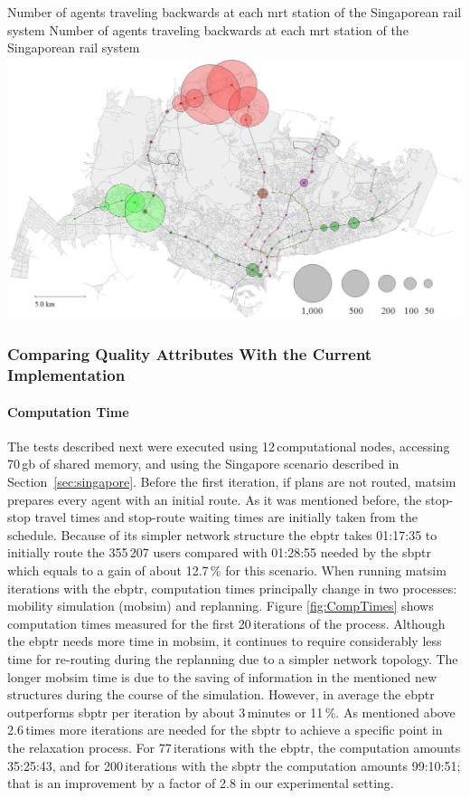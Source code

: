 \createfigure
{Number of agents traveling backwards at each \protect\gls{mrt} station of the Singaporean rail system}
{Number of agents traveling backwards at each \protect\gls{mrt} station of the Singaporean rail system}
{\label{fig:Backwards}}
{\includegraphics[width=1.0\textwidth]{extending/figures/ebr/Backwards.png}}
{}

\subsubsection{Comparing Quality Attributes With the Current Implementation}

\paragraph{Computation Time}

The tests described next were executed using 12\,computational nodes, accessing 70\,\gls{gb} of shared memory, and using the Singapore scenario described in Section~\ref{sec:singapore}. Before the first iteration, if plans are not routed, \gls{matsim} prepares every agent with an initial route. As it was mentioned before, the stop-stop travel times and stop-route waiting times are initially taken from the schedule. Because of its simpler network structure the \gls{ebptr} takes 01:17:35 to initially route the 355\,207 users compared with 01:28:55 needed by the \gls{sbptr} which equals to a gain of about 12.7\,\% for this scenario. When running \gls{matsim} iterations with the \gls{ebptr}, computation times principally change in two processes: mobility simulation (mobsim) and replanning. Figure \ref{fig:CompTimes} shows computation times measured for the first 20\,iterations of the process. Although the \gls{ebptr} needs more time in \gls{mobsim}, it continues to require considerably less time for re-routing during the replanning due to a simpler network topology. The longer mobsim time is due to the saving of information in the mentioned new structures during the course of the simulation. However, in average the \gls{ebptr} outperforms \gls{sbptr} per iteration by about 3\,minutes or 11\,\%. As mentioned above 2.6\,times more iterations are needed for the \gls{sbptr} to achieve a specific point in the relaxation process. For 77\,iterations with the \gls{ebptr}, the computation amounts 35:25:43, and for 200\,iterations with the \gls{sbptr} the computation amounts 99:10:51; that is an improvement by a factor of 2.8 in our experimental setting.

